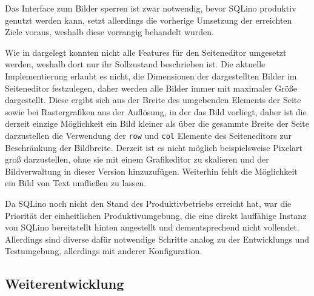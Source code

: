 Das Interface zum Bilder sperren ist zwar notwendig, bevor SQLino produktiv
genutzt werden kann, setzt allerdings die vorherige Umsetzung der erreichten
Ziele voraus, weshalb diese vorrangig behandelt wurden.

Wie in  dargelegt konnten nicht alle Features für
den Seiteneditor umgesetzt werden, weshalb dort nur ihr Sollzustand beschrieben
ist. Die aktuelle Implementierung erlaubt es nicht, die Dimensionen der
dargestellten Bilder im Seiteneditor festzulegen, daher werden alle Bilder immer
mit maximaler Größe dargestellt. Diese ergibt sich aus der Breite des umgebenden
Elements der Seite sowie bei Rastergrafiken aus der Auflösung, in der das Bild
vorliegt, daher ist die derzeit einzige Möglichkeit ein Bild kleiner als über
die gesammte Breite der Seite darzustellen die Verwendung der \texttt{row} und
\texttt{col} Elemente des Seiteneditors zur Beschränkung der Bildbreite. Derzeit
ist es nicht möglich beispielsweise Pixelart groß darzustellen, ohne sie mit
einem Grafikeditor zu skalieren und der Bildverwaltung in dieser Version
hinzuzufügen. Weiterhin fehlt die Möglichkeit ein Bild von Text umfließen zu
lassen.

Da SQLino noch nicht den Stand des Produktivbetriebs erreicht hat, war die
Priorität der einheitlichen Produktivumgebung, die eine direkt lauffähige
Instanz von SQLino bereitstellt hinten angestellt und dementsprechend nicht
vollendet. Allerdings sind diverse dafür notwendige Schritte analog zu der
Entwicklungs und Testumgebung, allerdings mit anderer Konfiguration.

\subsection{Weiterentwicklung}




